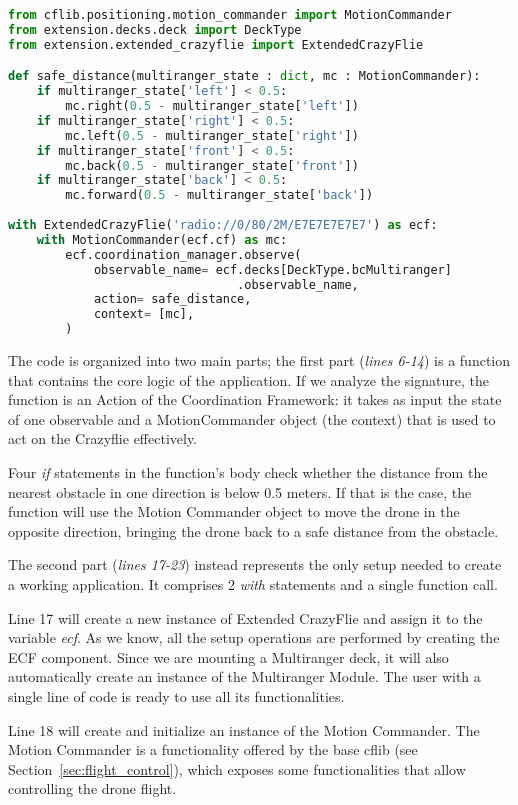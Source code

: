 \begin{lstlisting}[language=Python]
from cflib.positioning.motion_commander import MotionCommander
from extension.decks.deck import DeckType
from extension.extended_crazyflie import ExtendedCrazyFlie

def safe_distance(multiranger_state : dict, mc : MotionCommander):
    if multiranger_state['left'] < 0.5:
        mc.right(0.5 - multiranger_state['left'])
    if multiranger_state['right'] < 0.5:
        mc.left(0.5 - multiranger_state['right'])
    if multiranger_state['front'] < 0.5:
        mc.back(0.5 - multiranger_state['front'])
    if multiranger_state['back'] < 0.5:
        mc.forward(0.5 - multiranger_state['back'])
    
with ExtendedCrazyFlie('radio://0/80/2M/E7E7E7E7E7') as ecf:
    with MotionCommander(ecf.cf) as mc:
        ecf.coordination_manager.observe(
        	observable_name= ecf.decks[DeckType.bcMultiranger]
                                .observable_name,
        	action= safe_distance,
            context= [mc],
        )
\end{lstlisting}

The code is organized into two main parts; the first part (\textit{lines 6-14}) is a function that contains the core logic of the application. 
If we analyze the signature, the function is an Action of the Coordination Framework: it takes as input the state of one observable and a MotionCommander object (the context) that is used to act on the Crazyflie effectively.

Four \textit{if} statements in the function's body check whether the distance from the nearest obstacle in one direction is below 0.5 meters. 
If that is the case, the function will use the Motion Commander object to move the drone in the opposite direction, bringing the drone back to a safe distance from the obstacle.

The second part (\textit{lines 17-23}) instead represents the only setup needed to create a working application. 
It comprises 2 \textit{with} statements and a single function call. 

Line 17 will create a new instance of Extended CrazyFlie and assign it to the variable \textit{ecf}.
As we know, all the setup operations are performed by creating the ECF component. 
Since we are mounting a Multiranger deck, it will also automatically create an instance of the Multiranger Module. 
The user with a single line of code is ready to use all its functionalities. 

Line 18 will create and initialize an instance of the Motion Commander. 
The Motion Commander is a functionality offered by the base cflib (see Section~\ref{sec:flight_control}), which exposes some functionalities that allow controlling the drone flight. 

